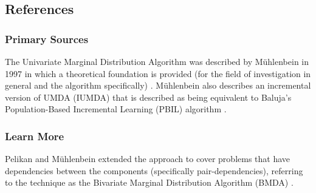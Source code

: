 

\subsection{References}

% 
% 
\subsubsection{Primary Sources}
The Univariate Marginal Distribution Algorithm was described by M\"uhlenbein in 1997 in which a theoretical foundation is provided (for the field of investigation in general and the algorithm specifically) \cite{Muhlenbein1997}. M\"uhlenbein also describes an incremental version of UMDA (IUMDA) that is described as being equivalent to Baluja's Population-Based Incremental Learning (PBIL) algorithm \cite{Baluja1994}.

% 
% 
\subsubsection{Learn More}
Pelikan and M\"uhlenbein extended the approach to cover problems that have dependencies between the components (specifically pair-dependencies), referring to the technique as the Bivariate Marginal Distribution Algorithm (BMDA) \cite{Pelikan1998, Pelikan1999}.


